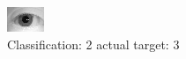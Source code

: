\begin{figure}[h!]
\begin{center}
\includegraphics[width=0.60\columnwidth]{figures/ID1133_class_2_target_3.png}
\end{center}
\caption{ Classification: 2 actual target: 3}
\label{fig:ID1133_class_2_target_3}
\end{figure}
